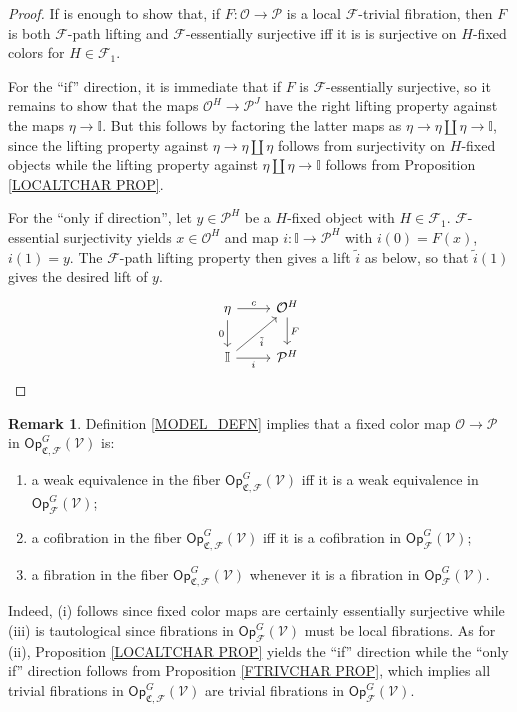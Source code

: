 \documentclass[a4paper,10pt
,draft
]{article}%
\numberwithin{equation}{section}
\numberwithin{figure}{section}
\theoremstyle{definition} %
\newtheorem{remark}[equation]{Remark}%
\newcommand{\F}{\ensuremath{\mathcal F}}
\newcommand{\V}{\ensuremath{\mathcal V}}
\renewcommand{\O}{\ensuremath{\mathcal O}}
\renewcommand{\P}{\ensuremath{\mathcal P}}
\newcommand{\1}{\ensuremath{\mathbbm 1}}%
\begin{document}
\begin{proof}
If is enough to show that,
if $F \colon \O \to \P$ is a local $\F$-trivial fibration,
then $F$ is both $\F$-path lifting and $\F$-essentially surjective
iff it is is surjective on $H$-fixed colors for $H \in \F_1$.

For the ``if'' direction, it is immediate that if $F$ is
$\F$-essentially surjective, so it remains to show that
the maps $\O^H\to \P^J$
have the right lifting property against the maps
$\eta \to \mathbb{I}$.
But this follows by factoring the latter maps as
$\eta \to \eta \amalg \eta \to \mathbb{I}$, 
since the lifting property against 
$\eta \to \eta \amalg \eta$ follows from surjectivity on $H$-fixed objects while the lifting property against
$\eta \amalg \eta \to \mathbb{I}$
follows from Proposition \ref{LOCALTCHAR PROP}.

For the ``only if direction'', let $y \in \P^H$ be a $H$-fixed object with $H \in \F_1$.
$\F$-essential surjectivity yields $x \in \O^H$ and map 
$i \colon \mathbb{I} \to \P^H$
with $i(0)=F(x)$, $i(1)=y$.
The $\F$-path lifting property then gives a lift $\tilde{i}$ as below, 
so that $\tilde{i}(1)$ gives the desired lift of $y$.
\[
\begin{tikzcd}
	\eta \ar{d}[swap]{0} \ar{r}{c}  
&
	\O^H \arrow{d}{F}
\\
	\mathbb{I} \ar{r}[swap]{i} \ar{ru}[swap]{\tilde{i}}
&
	\P^H
\end{tikzcd}
\]   
\end{proof}




\begin{remark}\label{FIBERGLMOD REM}
Definition \ref{MODEL_DEFN} implies that a fixed color map
$\O \to \P$ in 
$\mathsf{Op}^G_{\mathfrak{C},\F}(\V)$ is:
\begin{enumerate}[label=(\roman*)]
\item a weak equivalence in the fiber
$\mathsf{Op}_{\mathfrak{C},\F}^G(\V)$
iff it is a weak equivalence in
$\mathsf{Op}_{\F}^G(\V)$;
\item a cofibration in the fiber 
$\mathsf{Op}_{\mathfrak{C},\F}^G(\V)$
iff it is a cofibration in
$\mathsf{Op}_{\F}^G(\V)$;
\item a fibration in the fiber 
$\mathsf{Op}_{\mathfrak{C},\F}^G(\V)$
whenever it is a fibration in
$\mathsf{Op}_{\F}^G(\V)$.
\end{enumerate}
Indeed, (i) follows since fixed color maps are certainly essentially surjective while (iii) is tautological since 
fibrations in $\mathsf{Op}_{\F}^G(\V)$ must be local fibrations.
As for (ii), 
Proposition \ref{LOCALTCHAR PROP} yields the ``if'' direction
while the ``only if'' direction follows from 
Proposition \ref{FTRIVCHAR PROP}, 
which implies all trivial fibrations in $\mathsf{Op}_{\mathfrak{C},\F}^G(\V)$
are trivial fibrations in 
$\mathsf{Op}_{\F}^G(\V)$.
\end{remark}
\end{document}

